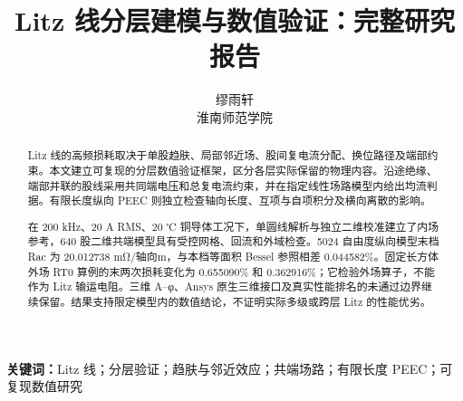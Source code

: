 \documentclass[11pt,a4paper]{article}
\title{Litz 线分层建模与数值验证：完整研究报告}
\author{缪雨轩\\淮南师范学院}
\date{}
\begin{document}
\maketitle
\begin{abstract}
Litz 线的高频损耗取决于单股趋肤、局部邻近场、股间复电流分配、换位路径及端部约束。本文建立可复现的分层数值验证框架，区分各层实际保留的物理内容。沿途绝缘、端部并联的股线采用共同端电压和总复电流约束，并在指定线性场路模型内给出均流判据。有限长度纵向 PEEC 则独立检查轴向长度、互项与自项积分及横向离散的影响。

在 200 kHz、20 A RMS、20 ℃ 铜导体工况下，单圆线解析与独立二维校准建立了内场参考，640 股二维共端模型具有受控网格、回流和外域检查。5024 自由度纵向模型末档 Rac 为 20.012738 mΩ/轴向m，与本档等面积 Bessel 参照相差 0.044582\%。固定长方体外场 RT0 算例的末两次损耗变化为 0.655090\% 和 0.362916\%；它检验外场算子，不能作为 Litz 输运电阻。三维 A–φ、Ansys 原生三维接口及真实性能排名的未通过边界继续保留。结果支持限定模型内的数值结论，不证明实际多级或跨层 Litz 的性能优劣。
\end{abstract}
\noindent\textbf{关键词：}Litz 线；分层验证；趋肤与邻近效应；共端场路；有限长度 PEEC；可复现数值研究\par


















\renewcommand{\refname}{参考文献}

\end{document}
